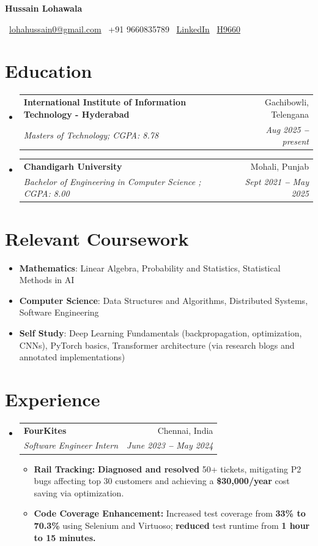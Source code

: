 \documentclass[letterpaper,10pt]{article} %
\makeatletter
\newcommand{\resumeItem}[2]{
  \item\small{
    \textbf{#1:} #2 \vspace{-2pt}
  }
}
\newcommand{\resumeSubheading}[4]{
  \vspace{-3pt}\item
    \begin{tabular*}{0.97\textwidth}{l@{\extracolsep{\fill}}r}
      \textbf{#1} & #2 \\
      \textit{\small#3} & \textit{\small #4} \\
    \end{tabular*}\vspace{-3pt}
}
\newcommand{\resumeSubHeadingListStart}{\begin{itemize}[leftmargin=*]}
\newcommand{\resumeSubHeadingListEnd}{\end{itemize}}
\newcommand{\resumeItemListStart}{\begin{itemize}[leftmargin=*]}
\newcommand{\resumeItemListEnd}{\end{itemize}\vspace{-7pt}}
\makeatother
\begin{document}



\begin{center}
    {\LARGE \textbf{Hussain Lohawala}}
    \vspace{0.8em}

    \faEnvelope~\href{mailto:lohahussain0@gmail.com}{lohahussain0@gmail.com}
    \hspace{2em}
    \faPhone~+91 9660835789
    \hspace{2em}
    \faLinkedin~\href{https://www.linkedin.com/in/hussain-lohawala-58b8661b7/}{LinkedIn}
    \hspace{2em}
    \faGithub~\href{https://github.com/H9660}{H9660}
\end{center}

\section{Education}
\resumeSubHeadingListStart
  \resumeSubheading{International Institute of Information Technology - Hyderabad}{Gachibowli, Telengana}
    {Masters of Technology; CGPA: 8.78}{Aug 2025\textbf{ –} present}
  \resumeSubheading{Chandigarh University}{Mohali, Punjab}
    {Bachelor of Engineering in Computer Science ; CGPA: 8.00}{Sept 2021 \textbf{–} May 2025}
\resumeSubHeadingListEnd

\section{Relevant Coursework}
\resumeSubHeadingListStart
\item \textbf{Mathematics}: Linear Algebra, Probability and Statistics, Statistical Methods in AI
\item \textbf{Computer Science}: Data Structures and Algorithms, Distributed Systems, Software Engineering
\item \textbf{Self Study}: Deep Learning Fundamentals (backpropagation, optimization, CNNs), PyTorch basics, Transformer architecture (via research blogs and annotated implementations)
\resumeSubHeadingListEnd



\section{Experience}
\resumeSubHeadingListStart
\resumeSubheading{FourKites}{Chennai, India}
{Software Engineer Intern}{June 2023 \textbf{–} May 2024}
\resumeItemListStart
\resumeItem{Rail Tracking} {\textbf{Diagnosed and resolved} 50+ tickets, mitigating P2 bugs affecting top 30 customers and achieving a \textbf{\$30,000/year} cost saving via optimization.}
\resumeItem{Code Coverage Enhancement} {Increased test coverage from \textbf{33\% to 70.3\%} using Selenium and Virtuoso; \textbf{reduced} test runtime from \textbf{1 hour to 15 minutes.}}
\resumeItemListEnd
\resumeSubHeadingListEnd
\end{document}
